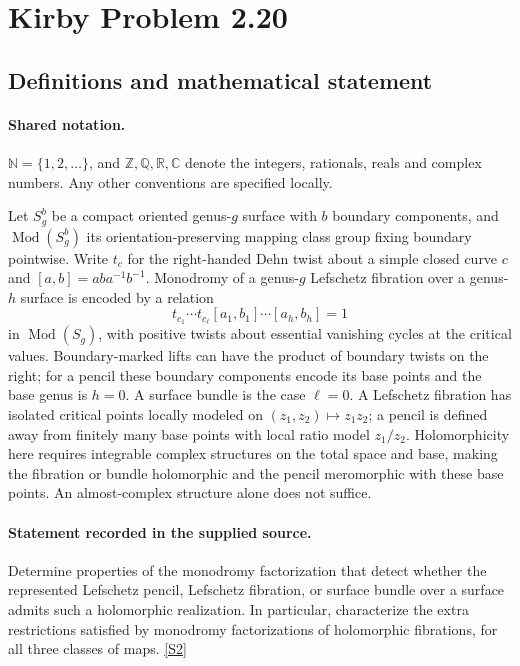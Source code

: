 \documentclass[11pt]{article}
\newcommand{\sref}[2]{\hyperlink{source:#1:#2}{[S#2]}}
\begin{document}
\section{Kirby Problem 2.20}\label{statement}

\subsection{Definitions and mathematical statement}

\paragraph{Shared notation.}$\mathbb N=\{1,2,\ldots\}$, and $\mathbb Z,\mathbb Q,\mathbb R,\mathbb C$ denote the integers, rationals, reals and complex numbers. Any other conventions are specified locally.


Let $S_g^b$ be a compact oriented genus-$g$ surface with $b$ boundary components, and $\operatorname{Mod}(S_g^b)$ its orientation-preserving mapping class group fixing boundary pointwise. Write $t_c$ for the right-handed Dehn twist about a simple closed curve $c$ and $[a,b]=aba^{-1}b^{-1}$. Monodromy of a genus-$g$ Lefschetz fibration over a genus-$h$ surface is encoded by a relation
\[t_{c_1}\cdots t_{c_\ell}[a_1,b_1]\cdots[a_h,b_h]=1\]
in $\operatorname{Mod}(S_g)$, with positive twists about essential vanishing cycles at the critical values. Boundary-marked lifts can have the product of boundary twists on the right; for a pencil these boundary components encode its base points and the base genus is $h=0$. A surface bundle is the case $\ell=0$. A Lefschetz fibration has isolated critical points locally modeled on $(z_1,z_2)\mapsto z_1z_2$; a pencil is defined away from finitely many base points with local ratio model $z_1/z_2$. Holomorphicity here requires integrable complex structures on the total space and base, making the fibration or bundle holomorphic and the pencil meromorphic with these base points. An almost-complex structure alone does not suffice.
\paragraph{Statement recorded in the supplied source.}
Determine properties of the monodromy factorization that detect whether the represented Lefschetz pencil, Lefschetz fibration, or surface bundle over a surface admits such a holomorphic realization. In particular, characterize the extra restrictions satisfied by monodromy factorizations of holomorphic fibrations, for all three classes of maps. \sref{statement}{2}
\end{document}
